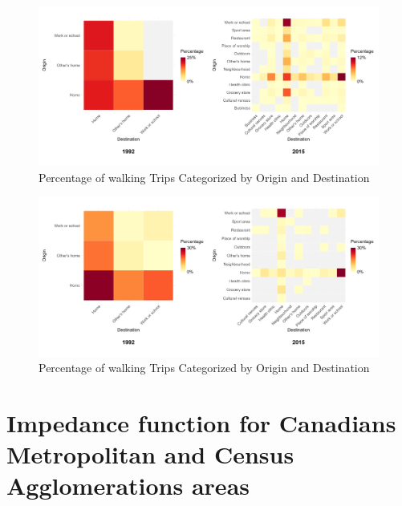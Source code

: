 \documentclass[Royal,times,sageh]{sagej}
\begin{document}
\begin{figure}

{\centering \includegraphics[width=1\linewidth]{Manuscript-figures/walking_hm_fig} 

}

\caption{Percentage of walking Trips Categorized by Origin and Destination}\label{fig:unnamed-chunk-1}
\end{figure}

\begin{figure}

{\centering \includegraphics[width=1\linewidth]{Manuscript-figures/cycling_hm_fig} 

}

\caption{Percentage of walking Trips Categorized by Origin and Destination}\label{fig:unnamed-chunk-2}
\end{figure}

\hypertarget{impedance-function-for-canadians-metropolitan-and-census-agglomerations-areas}{%
\section{Impedance function for Canadians Metropolitan and Census
Agglomerations
areas}\label{impedance-function-for-canadians-metropolitan-and-census-agglomerations-areas}}
\end{document}
